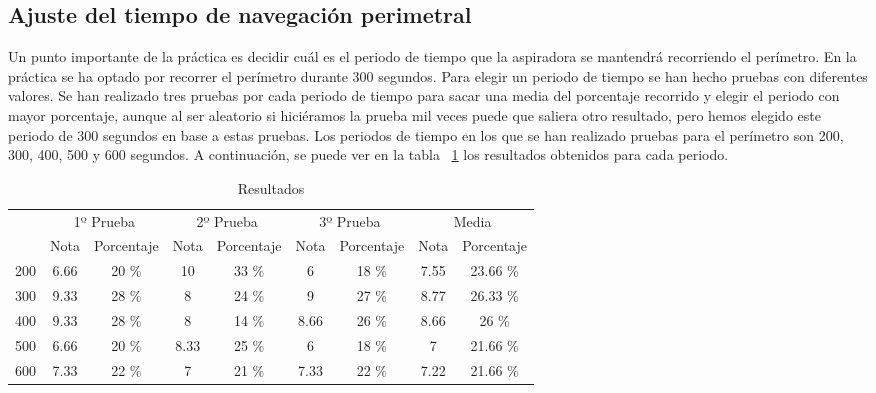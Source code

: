 \subsection{Ajuste del tiempo de navegación perimetral}
Un punto importante de la práctica es decidir cuál es el periodo de tiempo que la aspiradora se mantendrá recorriendo el perímetro. En la práctica se ha optado por recorrer el perímetro durante 300 segundos. Para elegir un periodo de tiempo se han hecho pruebas con diferentes valores. Se han realizado tres pruebas por cada periodo de tiempo para sacar una media del porcentaje recorrido y elegir el periodo con mayor porcentaje, aunque al ser aleatorio si hiciéramos la prueba mil veces puede que saliera otro resultado, pero hemos elegido este periodo de 300 segundos en base a estas pruebas. Los periodos de tiempo en los que se han realizado pruebas para el perímetro son 200, 300, 400, 500 y 600 segundos. A continuación, se puede ver en la tabla ~\ref{resultados_roomba} los resultados obtenidos para cada periodo.\\


\begin{table}[]
\centering
\caption{Resultados}
\label{resultados_roomba}
\begin{tabular}{c|c|c|c|c|c|c|c|c|}
\cline{2-9}
                          & \multicolumn{2}{c|}{1º Prueba} & \multicolumn{2}{c|}{2º Prueba} & \multicolumn{2}{c|}{3º Prueba} & \multicolumn{2}{c|}{Media} \\ \cline{2-9} 
                          & Nota        & Porcentaje       & Nota        & Porcentaje       & Nota        & Porcentaje       & Nota      & Porcentaje     \\ \hline
\multicolumn{1}{|c|}{200} & 6.66        & 20 \%            & 10          & 33 \%            & 6           & 18 \%            & 7.55      & 23.66 \%       \\ \hline
\multicolumn{1}{|c|}{300} & 9.33        & 28 \%            & 8           & 24 \%            & 9           & 27 \%            & 8.77      & 26.33 \%       \\ \hline
\multicolumn{1}{|c|}{400} & 9.33        & 28 \%            & 8           & 14 \%            & 8.66        & 26 \%            & 8.66      & 26 \%          \\ \hline
\multicolumn{1}{|c|}{500} & 6.66        & 20 \%            & 8.33        & 25 \%            & 6           & 18 \%            & 7         & 21.66 \%       \\ \hline
\multicolumn{1}{|c|}{600} & 7.33        & 22 \%            & 7           & 21 \%            & 7.33        & 22 \%            & 7.22      & 21.66 \%       \\ \hline
\end{tabular}
\end{table}

